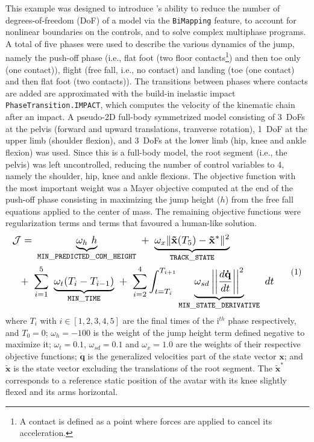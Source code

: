 This example was designed to introduce \bioptim's ability to reduce the number of degrees-of-freedom (DoF) of a model via the \texttt{BiMapping} feature, to account for nonlinear boundaries on the controls, and to solve complex multiphase programs.
A total of five phases were used to describe the various dynamics of the jump, namely the push-off phase (i.e., flat foot (two floor contacts\footnote{A contact is defined as a point where forces are applied to cancel its acceleration.}) and then toe only (one contact)), flight (free fall, i.e., no contact) and landing (toe (one contact) and then flat foot (two contacts)).
The transitions between phases where contacts are added are approximated with the build-in inelastic impact \texttt{PhaseTransition.IMPACT}, which computes the velocity of the kinematic chain after an impact.
A pseudo-2D full-body symmetrized model consisting of 3~DoFs at the pelvis (forward and upward translations, tranverse rotation), 1~DoF at the upper limb (shoulder flexion), and 3~DoFs at the lower limb (hip, knee and ankle flexion) was used.
Since this is a full-body model, the root segment (i.e., the pelvis) was left uncontrolled, reducing the number of control variables to 4, namely the shoulder, hip, knee and ankle flexions. 
The objective function with the most important weight was a Mayer objective computed at the end of the push-off phase consisting in maximizing the jump height ($h$) from the free fall equations applied to the center of mass.
The remaining objective functions were regularization terms and terms that favoured a human-like solution. 
\[ 
  \resizebox{0.90\columnwidth}{!}{$ 
  \begin{aligned}
  \mathcal{J} = &~\underbrace{\omega_h~h}_{\mathtt{MIN\_PREDICTED\_COM\_HEIGHT}}~+~\underbrace{\omega_{x} \| \mathbf{\tilde{x}}(T_5) - \mathbf{\tilde{x}}^*\|^2}_{\mathtt{TRACK\_STATE}}\\
  +~&\sum^5_{i=1}~\underbrace{\omega_{t}(T_i - T_{i-1})}_{\mathtt{MIN\_TIME}}~
    +~\sum_{i=2}^4\int_{t=T_i}^{T_{i+1}}\underbrace{\omega_{sd}\left|\left|\frac{d\mathbf{\dot{q}}}{dt}\right|\right|^2}_{\mathtt{MIN\_STATE\_DERIVATIVE}}~dt
  \end{aligned}  
  $} 
  \addtag  
  \label{eq:cost_jumper}
\]
where $T_i$ with $i \in [1, 2, 3, 4, 5]$ are the final times of the i$^{th}$ phase respectively, and $T_0=0$; 
$\omega_h=-100$ is the weight of the jump height term defined negative to maximize it; 
$\omega_t=0.1$, $\omega_{sd}=0.1$ and $\omega_x=1.0$ are the weights of their respective objective functions; 
$\mathbf{\dot{q}}$ is the generalized velocities part of the state vector $\mathbf{x}$; 
and $\mathbf{\tilde{x}}$ is the state vector excluding the translations of the root segment. 
The $\mathbf{\tilde{x}}^*$ corresponds to a reference static position of the avatar with its knee slightly flexed and its arms horizontal.

